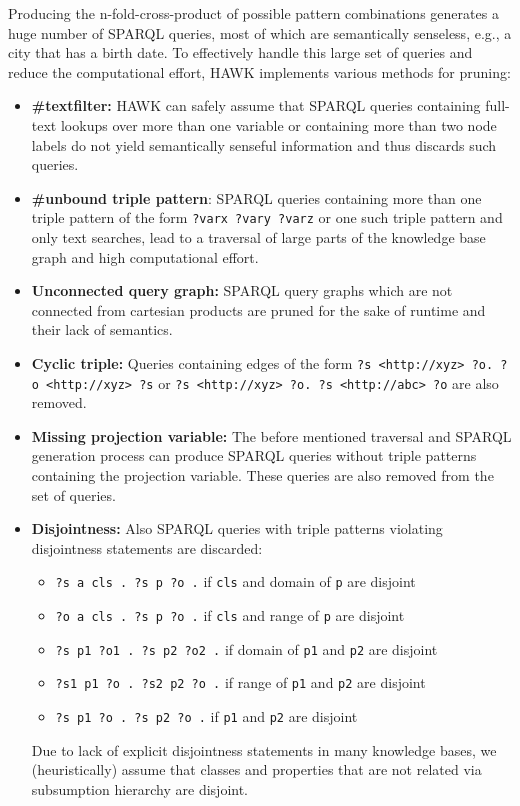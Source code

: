 Producing the n-fold-cross-product of possible pattern combinations generates a huge number of SPARQL queries, most of which are semantically senseless, e.g., a city that has a birth date. 
To effectively handle this large set of queries and reduce the computational effort, HAWK implements various methods for pruning:
\begin{itemize}
\item \textbf{\#textfilter: } HAWK can safely assume that SPARQL queries containing full-text lookups over more than one variable or containing more than two node labels do not yield semantically senseful information and thus discards such queries. 
\item \textbf{\#unbound triple pattern}: SPARQL queries containing more than one triple pattern of the form \texttt{?varx ?vary ?varz} or one such triple pattern and only text searches, lead to a traversal of large parts of the knowledge base graph and high computational effort.
\item \textbf{Unconnected query graph: } SPARQL query graphs which are not connected from cartesian products are pruned for the sake of runtime and their lack of semantics.
\item \textbf{Cyclic triple: } Queries containing edges of the form \texttt{?s <http://xyz>  ?o. ?o <http://xyz> ?s} or \texttt{?s <http://xyz>  ?o. ?s <http://abc> ?o} are also removed. 
\item \textbf{Missing projection variable: } The before mentioned traversal and SPARQL generation process can produce SPARQL queries without triple patterns containing the projection variable. These queries are also removed from the set of queries.
\item \textbf{Disjointness: }
Also SPARQL queries with triple patterns violating disjointness statements are discarded:
\begin{itemize}
\item \texttt{?s a  cls . ?s p ?o .} if \texttt{cls} and domain of \texttt{p} are disjoint
\item \texttt{?o a  cls . ?s p ?o .} if \texttt{cls} and range of \texttt{p} are disjoint
\item \texttt{?s p1  ?o1 . ?s p2 ?o2 .} if domain of \texttt{p1} and \texttt{p2} are disjoint
\item \texttt{?s1 p1  ?o . ?s2 p2 ?o .} if range of \texttt{p1} and \texttt{p2} are disjoint
\item \texttt{?s p1  ?o . ?s p2 ?o .} if \texttt{p1} and \texttt{p2} are disjoint
\end{itemize}
Due to lack of explicit disjointness statements in many knowledge bases, we (heuristically) assume that classes and properties that are not related via subsumption hierarchy are disjoint.
\end{itemize}


